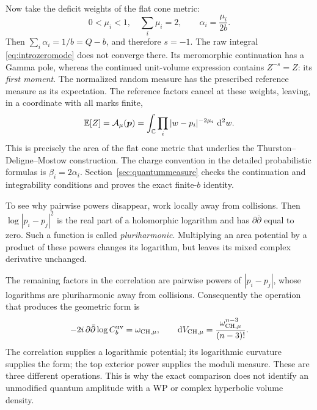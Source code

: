 Now take the deficit weights of the flat cone metric:
\[
 0<\mu_i<1,\quad \sum_i\mu_i=2,\qquad
 \alpha_i=\frac{\mu_i}{2b}.
\]
Then $\sum_i\alpha_i=1/b=Q-b$, and therefore $s=-1$.
The raw integral \eqref{eq:introzeromode} does not converge there.
Its meromorphic continuation has a Gamma pole, whereas the
continued unit-volume expression contains $Z^{-s}=Z$: its
\emph{first moment}. The normalized random measure has the prescribed
reference measure as its expectation. The reference factors cancel
at these weights, leaving, in a coordinate with all marks finite,
\begin{equation}
 \mathbb E[Z]=\mathcal A_\mu(\boldsymbol p)
   =\int_{\mathbb C}\prod_i|w-p_i|^{-2\mu_i}\,\mathop{}\!\mathrm d^2w.
 \label{eq:introfirstmoment}
\end{equation}
This is precisely the area of the flat cone metric that underlies
the Thurston--Deligne--Mostow construction. The charge convention
in the detailed probabilistic formulas is $\beta_i=2\alpha_i$.
Section~\ref{sec:quantummeasure} checks the continuation and
integrability conditions and proves the exact finite-$b$ identity.

To see why pairwise powers disappear, work locally away from
collisions. Then $\log|p_i-p_j|^2$ is the real part of a
holomorphic logarithm and has $\partial\bar\partial$ equal to
zero. Such a function is called \emph{pluriharmonic}. Multiplying
an area potential by a product of these powers changes its
logarithm, but leaves its mixed complex derivative unchanged.

The remaining factors in the correlation are pairwise powers of
$|p_i-p_j|$, whose logarithms are pluriharmonic away from collisions.
Consequently the operation that produces the geometric form is
\begin{equation}
 -2i\,\partial\bar\partial\log C_b^{\rm uv}
     =\omega_{\mathrm{CH},\mu},\qquad
 \mathop{}\!\mathrm d V_{\mathrm{CH},\mu}
     =\frac{\omega_{\mathrm{CH},\mu}^{n-3}}{(n-3)!}.
 \label{eq:introcurvaturemeasure}
\end{equation}
The correlation supplies a logarithmic potential; its logarithmic
curvature supplies the form; the top exterior power supplies the
moduli measure. These are three different operations. This is why
the exact comparison does not identify an unmodified quantum
amplitude with a WP or complex hyperbolic volume density.

